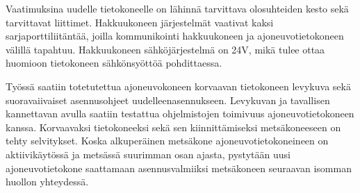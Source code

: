 Vaatimuksina uudelle tietokoneelle on lähinnä tarvittava olosuhteiden kesto sekä tarvittavat liittimet. Hakkuukoneen järjestelmät vaativat kaksi sarjaporttiliitäntää, joilla kommunikointi hakkuukoneen ja ajoneuvotietokoneen välillä tapahtuu. Hakkuukoneen sähköjärjestelmä on 24V, mikä tulee ottaa huomioon tietokoneen sähkönsyöttöä pohdittaessa.

Työssä saatiin totetutettua ajoneuvokoneen korvaavan tietokoneen levykuva sekä suoravaiivaiset asennusohjeet uudelleenasennukseen. Levykuvan ja tavallisen kannettavan avulla saatiin testattua ohjelmistojen toimivuus ajoneuvotietokoneen kanssa. Korvaavaksi tietokoneeksi sekä sen kiinnittämiseksi metsäkoneeseen on tehty selvitykset. Koska alkuperäinen metsäkone ajoneuvotietokoneineen on aktiivikäytössä ja metsässä suurimman osan ajasta, pystytään uusi ajoneuvotietokone saattamaan asennusvalmiiksi metsäkoneen seuraavan isomman huollon yhteydessä.










